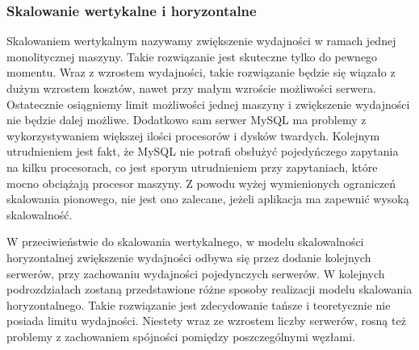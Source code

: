 \subsubsection{Skalowanie wertykalne i horyzontalne}
Skalowaniem wertykalnym nazywamy zwiększenie wydajności w ramach jednej monolitycznej maszyny. Takie rozwiązanie jest skuteczne tylko do pewnego momentu. Wraz z wzrostem wydajności, takie rozwiązanie będzie się wiązało z dużym wzrostem kosztów, nawet przy małym wzroście możliwości serwera. Ostatecznie osiągniemy limit możliwości jednej maszyny i zwiększenie wydajności nie będzie dalej możliwe. Dodatkowo sam serwer MySQL ma problemy z wykorzystywaniem większej ilości procesorów i dysków twardych. Kolejnym utrudnieniem jest fakt, że MySQL nie potrafi obsłużyć pojedyńczego zapytania na kilku procesorach, co jest sporym utrudnieniem przy zapytaniach, które mocno obciążają procesor maszyny. Z powodu wyżej wymienionych ograniczeń skalowania pionowego, nie jest ono zalecane, jeżeli aplikacja ma zapewnić wysoką skalowalność.

W przeciwieństwie do skalowania wertykalnego, w modelu skalowalności horyzontalnej zwiększenie wydajności odbywa się przez dodanie kolejnych serwerów, przy zachowaniu wydajności pojedynczych serwerów. W kolejnych podrozdziałach zostaną przedstawione różne sposoby realizacji modelu skalowania horyzontalnego. Takie rozwiązanie jest zdecydowanie tańsze i teoretycznie nie posiada limitu wydajności. Niestety wraz ze wzrostem liczby serwerów, rosną też problemy z zachowaniem spójności pomiędzy poszczególnymi węzłami.


